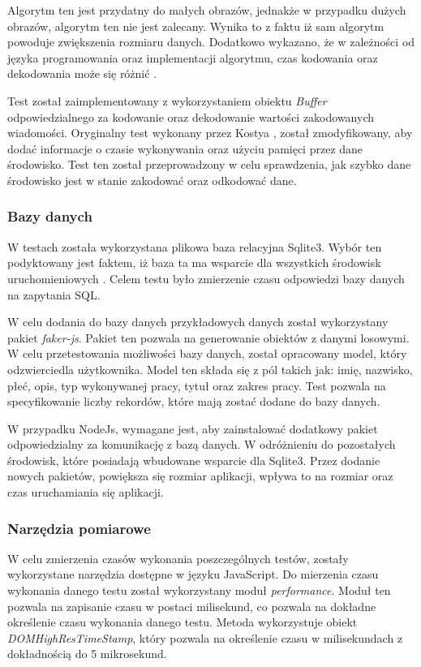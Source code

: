 Algorytm ten jest przydatny do małych obrazów, jednakże w przypadku dużych obrazów, algorytm ten nie jest zalecany. Wynika to z faktu iż sam algorytm powoduje zwiększenia rozmiaru danych. Dodatkowo wykazano, że w zależności od języka programowania oraz implementacji algorytmu, czas kodowania oraz dekodowania może się różnić \cite{cryptoeprint:2022/361}.

Test został zaimplementowany z wykorzystaniem obiektu \textit{Buffer} odpowiedzialnego za kodowanie oraz dekodowanie wartości zakodowanych wiadomości. Oryginalny test wykonany przez Kostya \cite{base64_benchmark}, został zmodyfikowany, aby dodać informacje o czasie wykonywania oraz użyciu pamięci przez dane środowisko. Test ten został przeprowadzony w celu sprawdzenia, jak szybko dane środowisko jest w stanie zakodować oraz odkodować dane.

\subsubsection{Bazy danych}
W testach została wykorzystana plikowa baza relacyjna Sqlite3. Wybór ten podyktowany jest faktem, iż baza ta ma wsparcie dla wszystkich środowisk uruchomieniowych \cite{sqlite}. Celem testu było zmierzenie czasu odpowiedzi bazy danych na zapytania SQL. 

W celu dodania do bazy danych przykładowych danych został wykorzystany pakiet \textit{faker-js}. Pakiet ten pozwala na generowanie obiektów z danymi losowymi. W celu przetestowania możliwości bazy danych, został opracowany model, który odzwierciedla użytkownika. Model ten składa się z pól takich jak: imię, nazwisko, płeć, opis, typ wykonywanej pracy, tytuł oraz zakres pracy. Test pozwala na specyfikowanie liczby rekordów, które mają zostać dodane do bazy danych.

W przypadku NodeJs, wymagane jest, aby zainstalować dodatkowy pakiet odpowiedzialny za komunikację z bazą danych. W odróżnieniu do pozostałych środowisk, które posiadają wbudowane wsparcie dla Sqlite3. Przez dodanie nowych pakietów, powiększa się rozmiar aplikacji, wpływa to na rozmiar oraz czas uruchamiania się aplikacji.

\subsubsection{Narzędzia pomiarowe}
W celu zmierzenia czasów wykonania poszczególnych testów, zostały wykorzystane narzędzia dostępne w języku JavaScript. Do mierzenia czasu wykonania danego testu został wykorzystany moduł \textit{performance}. Moduł ten pozwala na zapisanie czasu w postaci milisekund, co pozwala na dokładne określenie czasu wykonania danego testu. Metoda wykorzystuje obiekt \textit{DOMHighResTimeStamp}, który pozwala na określenie czasu w milisekundach z dokładnością do 5 mikrosekund.

